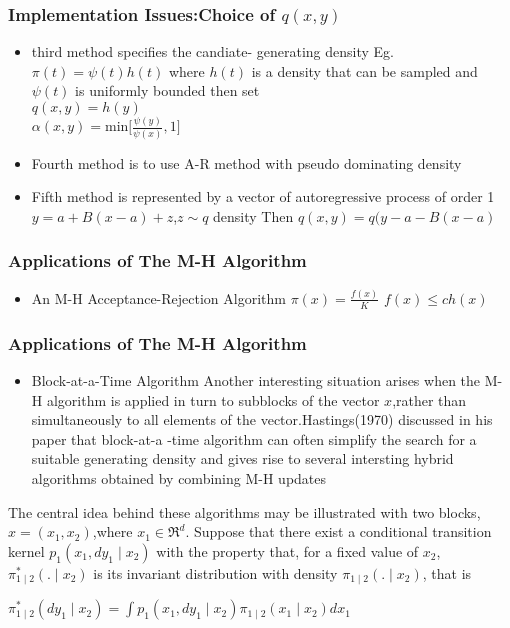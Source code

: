 \documentclass[hyperref={pdfpagelabels=false}]{beamer}
\begin{document}
\begin{frame}
\frametitle{Implementation Issues:Choice of $q(x,y)$}
\begin{itemize}
\item third method specifies the candiate- generating density Eg. $\pi(t)=\psi(t)h(t)$
where $h(t)$ is a density that can be sampled and $\psi(t)$ is uniformly  bounded then set\\
 $q(x,y)=h(y)$\\
$\alpha(x,y)=\textrm{min}\Bigg[\frac{\psi(y)}{\psi(x)},1\Bigg] $

\pause
\item Fourth method is to use A-R method with pseudo dominating density


\pause
\item Fifth method is represented by a vector of autoregressive process of order 1\\
$y=a +B(x-a)+z$,$z \sim q$ density
Then $q(x,y)=q(y-a-B(x-a)$
\end{itemize}
\end{frame}


\begin{frame}
\frametitle{Applications of The M-H Algorithm}
\begin{itemize}
\item An M-H  Acceptance-Rejection Algorithm
$\pi(x)=\frac{f(x)}{K}$
$f(x)\leq ch(x)$

\end{itemize}
\end{frame}



\begin{frame}
\frametitle{Applications of The M-H Algorithm}
\begin{itemize}
\item Block-at-a-Time Algorithm
Another interesting situation arises when the M-H algorithm is applied in turn to subblocks of the
vector $x$,rather than simultaneously to all elements of the vector.Hastings(1970) discussed in his paper that block-at-a -time algorithm 
 can often simplify  the search for a suitable generating density and gives rise to several intersting hybrid algorithms
obtained by combining M-H updates

\end{itemize}

\end{frame}

\begin{frame}
The central idea behind these algorithms may be illustrated with two blocks,$x=(x_{1},x_{2})$,where $x_{1} \in  \Re^{d}$.
Suppose that there exist a conditional transition kernel $p_{1}(x_{1},dy_{1} \mid x_{2})$ with the property that,
for a fixed value of $x_{2}$,$\pi_{1 \mid 2}^{*}(.\mid x_{2})$ is its invariant distribution with density $\pi_{1 \mid 2}(.\mid x_{2})$,
that is


$\pi_{1 \mid 2}^{*}(dy_{1}\mid x_{2})=\int p_{1}(x_{1},dy_{1}\mid x_{2})\pi_{1 \mid 2}(x_{1}\mid x_{2})dx_{1}$
\end{frame}
\end{document}
